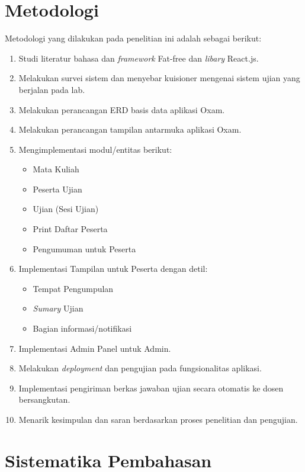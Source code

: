 \section{Metodologi}
Metodologi yang dilakukan pada penelitian ini adalah sebagai berikut:
\label{sec:metlit}
    \begin{enumerate}
        \item Studi literatur bahasa dan \textit{framework} Fat-free dan
            \textit{libary} React.js.
        \item Melakukan survei sistem dan menyebar kuisioner mengenai sistem ujian 
            yang berjalan pada lab.
		\item Melakukan perancangan ERD basis data aplikasi Oxam.
		\item Melakukan perancangan tampilan antarmuka aplikasi Oxam.
		\item Mengimplementasi modul/entitas berikut:
		    \begin{itemize}
		        \item Mata Kuliah
		        \item Peserta Ujian
		        \item Ujian (Sesi Ujian)
		        \item Print Daftar Peserta
		        \item Pengumuman untuk Peserta
		    \end{itemize}
	     \item Implementasi Tampilan untuk Peserta dengan detil:
		    \begin{itemize}
		        \item Tempat Pengumpulan
		        \item \textit{Sumary} Ujian
		        \item Bagian informasi/notifikasi
		    \end{itemize}
		\item Implementasi Admin Panel untuk Admin.
	    \item Melakukan \textit{deployment} dan pengujian pada fungsionalitas
	        aplikasi.
	    \item Implementasi pengiriman berkas jawaban ujian secara otomatis ke
	        dosen bersangkutan.
        \item Menarik kesimpulan dan saran berdasarkan proses penelitian dan
            pengujian.
    \end{enumerate}

\section{Sistematika Pembahasan}
\label{sec:sispem}

